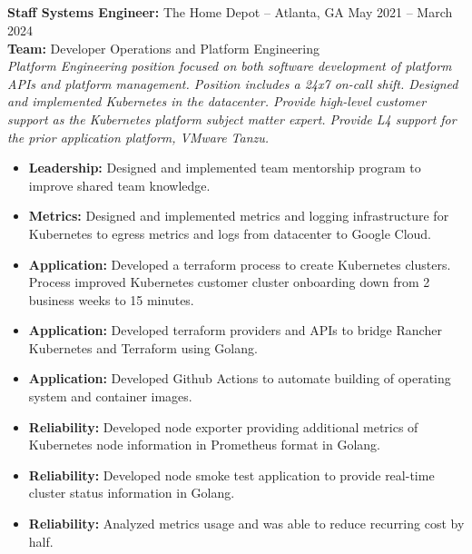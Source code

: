 \documentclass[11pt]{article}       %
\begin{document}
\subsection*{}
\textbf{Staff Systems Engineer:} {The Home Depot} -- Atlanta, GA \hfill May 2021 -- March 2024 \\
\vspace{4pt}
\textbf{Team:} Developer Operations and Platform Engineering \\
\vspace{4pt}
\textit{Platform Engineering position focused on both software development of platform APIs and platform management. Position includes a 24x7 on-call shift. Designed and implemented Kubernetes in the datacenter. Provide high-level customer support as the Kubernetes platform subject matter expert. Provide L4 support for the prior application platform, VMware Tanzu.} \\
\vspace{-6.5pt}
\begin{itemize}
  \item \textbf{Leadership:} Designed and implemented team mentorship program to improve shared team knowledge.
  \item \textbf{Metrics:} Designed and implemented metrics and logging infrastructure for Kubernetes to egress metrics and logs from datacenter to Google Cloud.
  \item \textbf{Application:} Developed a terraform process to create Kubernetes clusters. Process improved Kubernetes customer cluster onboarding down from 2 business weeks to 15 minutes.
  \item \textbf{Application:} Developed terraform providers and APIs to bridge Rancher Kubernetes and Terraform using Golang.
  \item \textbf{Application:} Developed Github Actions to automate building of operating system and container images.
  \item \textbf{Reliability:} Developed node exporter providing additional metrics of Kubernetes node information in Prometheus format in Golang.
  \item \textbf{Reliability:} Developed node smoke test application to provide real-time cluster status information in Golang.
  \item \textbf{Reliability:} Analyzed metrics usage and was able to reduce recurring cost by half.
\end{itemize}
\end{document}
